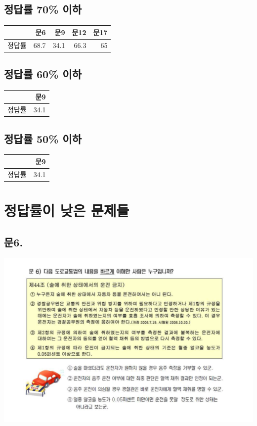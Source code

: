 \documentclass[
]{book}
\begin{document}
\subsection{정답률 70\% 이하}\label{uxc815uxb2f5uxb960-70-uxc774uxd558}

\begin{tabular}{l|r|r|r|r}
\hline
  & 문6 & 문9 & 문12 & 문17\\
\hline
정답률 & 68.7 & 34.1 & 66.3 & 65\\
\hline
\end{tabular}

\subsection{정답률 60\% 이하}\label{uxc815uxb2f5uxb960-60-uxc774uxd558}

\begin{tabular}{l|r}
\hline
  & 문9\\
\hline
정답률 & 34.1\\
\hline
\end{tabular}

\subsection{정답률 50\% 이하}\label{uxc815uxb2f5uxb960-50-uxc774uxd558}

\begin{tabular}{l|r}
\hline
  & 문9\\
\hline
정답률 & 34.1\\
\hline
\end{tabular}

\section{정답률이 낮은 문제들}\label{uxc815uxb2f5uxb960uxc774-uxb0aeuxc740-uxbb38uxc81cuxb4e4}

\subsection{문6.}\label{uxbb386.}

\begin{flushleft}\includegraphics[width=0.75\linewidth]{./pics/Q06} \end{flushleft}
\end{document}
